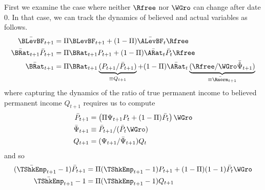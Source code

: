 \documentclass{handout}
\begin{document}
First we examine the case where neither $\Rfree$ nor $\WGro$ can change after date $0$.
In that case, we can track the dynamics of believed and actual variables as follows.
\begin{equation}\begin{gathered}\begin{aligned}
  \bar{\BLevBF}_{t+1} & =  \Pi \BLevBF_{t+1} + (1-\Pi) \bar{\ALevBF}_{t} \Rfree
\\ \bar{\BRat}_{t+1}\bar{P}_{t+1} & =  \Pi \BRat_{t+1}P_{t+1} + (1-\Pi) \bar{\ARat}_{t}\bar{P}_{t} \Rfree
\\ \bar{\BRat}_{t+1} & =  \Pi \BRat_{t+1}\underbrace{(P_{t+1}/\bar{P}_{t+1})}_{\equiv Q_{t+1}} + (1-\Pi)\bar{\ARat}_{t} \underbrace{(\Rfree/\WGro \bar{\hat{\Psi}}_{t+1})}_{\equiv \bar{\Rnorm}_{t+1}} 
\end{aligned}\end{gathered}\end{equation}
where capturing the dynamics of the ratio of true permanent income to
believed permanent income $Q_{t+1}$ requires us to compute
\begin{equation}\begin{gathered}\begin{aligned}
  \bar{P}_{t+1} & =  \left(\Pi \Psi_{t+1} P_{t} + (1-\Pi) \bar{P}_{t}\right)\WGro
\\ \bar{\Psi}_{t+1} & \equiv  \bar{P}_{t+1}/(\bar{P}_{t} \WGro)
\\ Q_{t+1} & =  (\Psi_{t+1}/\bar{\Psi}_{t+1}) Q_{t}
\end{aligned}\end{gathered}\end{equation}
and so
\begin{equation}\begin{gathered}\begin{aligned}
  (\bar{\TShkEmp}_{t+1}-1)\bar{P}_{t+1} & =  \Pi (\TShkEmp_{t+1}-1) P_{t+1} + (1-\Pi) (1-1) \bar{P}_{t} \WGro
\\  \bar{\TShkEmp}_{t+1}-1 & =  \Pi (\TShkEmp_{t+1}-1) Q_{t+1}
\end{aligned}\end{gathered}\end{equation}
\end{document}
